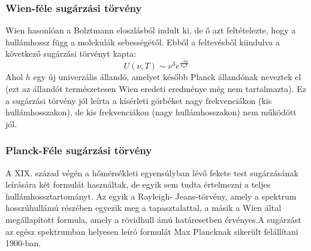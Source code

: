 \documentclass[../main.tex]{subfiles}
\begin{document}
\subsubsection{Wien-féle sugárzási törvény}
Wien hasonlóan a Bolztmann eloszlásból indult ki, de ő azt feltételezte, hogy a hullámhossz függ a molekulák sebességétől. Ebből a feltevésből kiindulva a következő sugárzási törvényt kapta:
\begin{equation}
    U(\nu, T) \sim \nu^3 e^{\frac{- h \nu}{k_BT}}
\end{equation}
Ahol $h$ egy új univerzális állandó, amelyet később Planck állandónak neveztek el (ezt az állandót természetesen Wien eredeti eredménye még nem tartalmazta). Ez a sugárzási törvény jól leírta a kísérleti görbéket nagy frekvenciákon (kis hullámhosszakon), de kis frekvenciákon (nagy hullámhosszakon) nem működött jól.

\subsubsection{Planck-Féle sugárzási törvény}
A XIX. század végén a hőmérsékleti egyensúlyban lévő fekete test sugárzásának leírására két formulát használtak, de egyik sem tudta értelmezni a teljes
hullámhossztartományt. Az egyik a Rayleigh- Jeans-törvény, amely a spektrum hosszúhullámú részében egyezik meg a tapasztalattal, a másik a Wien
által megállapított formula, amely a rövidhull ámú határesetben érvényes.A sugárzást az egész spektrumban helyesen leíró formulát Max Plancknak sikerült felállítani 1900-ban.
\end{document}
